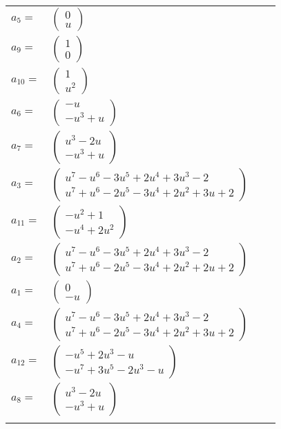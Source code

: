 \documentclass[1p]{elsarticle_modified}
\theoremstyle{definition}
\begin{document}
\begin{tabular}{m{7pt} m{180pt} m{7pt} m{180pt} }
\flushright $a_{5}=$&$\begin{pmatrix}0\\u\end{pmatrix}$ \\
\flushright $a_{9}=$&$\begin{pmatrix}1\\0\end{pmatrix}$ \\
\flushright $a_{10}=$&$\begin{pmatrix}1\\u^2\end{pmatrix}$ \\
\flushright $a_{6}=$&$\begin{pmatrix}- u\\- u^3+u\end{pmatrix}$ \\
\flushright $a_{7}=$&$\begin{pmatrix}u^3-2 u\\- u^3+u\end{pmatrix}$ \\
\flushright $a_{3}=$&$\begin{pmatrix}u^7- u^6-3 u^5+2 u^4+3 u^3-2\\u^7+u^6-2 u^5-3 u^4+2 u^2+3 u+2\end{pmatrix}$ \\
\flushright $a_{11}=$&$\begin{pmatrix}- u^2+1\\- u^4+2 u^2\end{pmatrix}$ \\
\flushright $a_{2}=$&$\begin{pmatrix}u^7- u^6-3 u^5+2 u^4+3 u^3-2\\u^7+u^6-2 u^5-3 u^4+2 u^2+2 u+2\end{pmatrix}$ \\
\flushright $a_{1}=$&$\begin{pmatrix}0\\- u\end{pmatrix}$ \\
\flushright $a_{4}=$&$\begin{pmatrix}u^7- u^6-3 u^5+2 u^4+3 u^3-2\\u^7+u^6-2 u^5-3 u^4+2 u^2+3 u+2\end{pmatrix}$ \\
\flushright $a_{12}=$&$\begin{pmatrix}- u^5+2 u^3- u\\- u^7+3 u^5-2 u^3- u\end{pmatrix}$ \\
\flushright $a_{8}=$&$\begin{pmatrix}u^3-2 u\\- u^3+u\end{pmatrix}$\\&\end{tabular}
\end{document}

